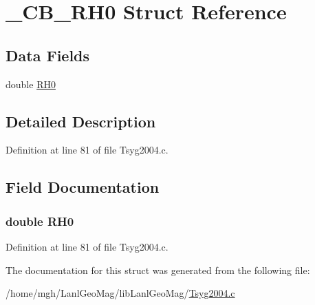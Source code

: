 \hypertarget{struct___c_b___r_h0}{
\section{\_\-CB\_\-RH0 Struct Reference}
\label{struct___c_b___r_h0}
}
\subsection*{Data Fields}
\begin{CompactItemize}
\item 
double \hyperlink{struct___c_b___r_h0_b8de82fc4984cbf441791ce41d02862e}{RH0}
\end{CompactItemize}


\subsection{Detailed Description}


Definition at line 81 of file Tsyg2004.c.

\subsection{Field Documentation}
\hypertarget{struct___c_b___r_h0_b8de82fc4984cbf441791ce41d02862e}{
\subsubsection[{RH0}]{\setlength{\rightskip}{0pt plus 5cm}double {\bf RH0}}}
\label{struct___c_b___r_h0_b8de82fc4984cbf441791ce41d02862e}




Definition at line 81 of file Tsyg2004.c.

The documentation for this struct was generated from the following file:\begin{CompactItemize}
\item 
/home/mgh/LanlGeoMag/libLanlGeoMag/\hyperlink{_tsyg2004_8c}{Tsyg2004.c}\end{CompactItemize}
